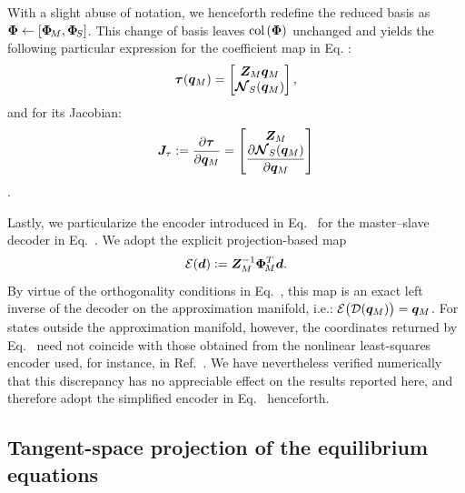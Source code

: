 \documentclass[preprint,10pt]{elsarticle}  %
\begin{document}
With a slight abuse of notation, we henceforth redefine the reduced
basis as $\bm{\Phi} \leftarrow [\bm{\Phi}_{\!M},\bm{\Phi}_{\!S}]$.  This  change of basis leaves
\(\operatorname{col}{(\bm{\Phi})}\) unchanged and yields the following particular
expression for the coefficient map in Eq. :
\begin{equation}
\label{eq:tau_master_slave}
    \bm{\tau}(\bm{q}_M)
    =
    \begin{bmatrix}
        \bm{Z}_{M}\bm{q}_M\\
        \boldsymbol{\mathcal{N}}_{S}(\bm{q}_M)
    \end{bmatrix},
\end{equation}
and for its Jacobian:
\begin{equation}
\label{eq:JTAU}
\bm{J}_{\tau}
:=
\dfrac{\partial \bm{\tau}}{\partial \bm{q}_M} = \begin{bmatrix}
                             \bm{Z}_{M}  \\
                             \dfrac{\partial \boldsymbol{\mathcal{N}}_{S}(\bm{q}_M)}{\partial \bm{q}_M}
                     \end{bmatrix}
\end{equation}.

Lastly, we particularize the encoder introduced in
Eq.~ for the master--slave decoder in
Eq.~. We adopt the explicit
projection-based map
\begin{equation}
\label{eq:encoder_explicit}
    \mathcal{\boldsymbol{E}}(\bm{d})
    \mathrel{\mathop:}=
    \bm{Z}_{M}^{-1}\bm{\Phi}_{\!M}^T\bm{d}.
\end{equation}
 By virtue of the orthogonality conditions in
Eq.~,  this map is an
exact left inverse of the decoder on the approximation manifold, i.e.: $\mathcal{\boldsymbol{E}}\bigl(\mathcal{\boldsymbol{D}}(\bm{q}_M)\bigr)=\bm{q}_M$.
For states outside the approximation manifold, however, the coordinates
returned by Eq.~ need not coincide with those
obtained from the nonlinear least-squares encoder used, for instance, in
Ref.~\cite{ares2026nonlinear}. We have nevertheless verified numerically
that this discrepancy has no appreciable effect on the results reported
here, and therefore adopt the simplified encoder in
Eq.~ henceforth.

\subsection{Tangent-space projection of the equilibrium equations}
\end{document}
